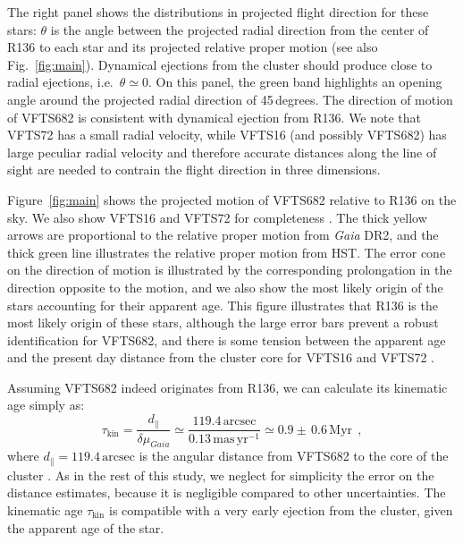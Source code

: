 \documentclass[apjl,twocolumn]{emulateapj}
\newcommand{\masyr}{\,\mathrm{mas}\,\mathrm{yr}^{-1}}
\DeclareRobustCommand{\Figref}[1]{Fig.~\ref{#1}}
\begin{document}
The right panel shows the distributions in projected flight direction for these
stars: $\theta$ is the angle between the projected radial direction from the
center of R136 to each star and its projected relative proper motion (see also \Figref{fig:main}). Dynamical ejections from the
cluster should %
produce
close to radial ejections, i.e.~$\theta\simeq0$. On this panel, the green band highlights
an opening angle around the
projected radial direction of 45\,degrees. The direction of motion of VFTS682 %
is consistent with dynamical ejection from R136. We note that
VFTS72 has a small radial velocity, while VFTS16 (and possibly VFTS682) has
large peculiar radial velocity and therefore accurate distances along
the line of sight are
needed to contrain the flight direction in three dimensions.

Figure~\ref{fig:main} shows the projected motion of VFTS682 relative to R136 on the
sky. We also show VFTS16 and VFTS72 for completeness
\citep[see][]{lennon:18}. The thick yellow arrows are proportional to
the relative proper motion from \emph{Gaia} DR2, and the thick green
line illustrates the relative proper motion from HST. The error cone
on the direction of motion is illustrated by the corresponding
prolongation in the direction opposite to the motion, and we also show
the most likely origin of the stars accounting for their apparent age.
This figure illustrates that R136 is the most likely origin of these stars, although the large error bars
prevent a robust identification for VFTS682, and there is some tension
between the apparent age and the present day distance from the cluster
core for VFTS16 and VFTS72 \citep[][]{lennon:18}. 

Assuming VFTS682 indeed originates from R136, we can calculate its kinematic
age simply as:
\begin{equation}
  \label{eq:kin_age}
  \tau_\mathrm{kin} = \frac{d_\parallel}{\delta\mu_{Gaia}} \simeq
  \frac{119.4\,\mathrm{arcsec}}{0.13\masyr} \simeq 0.9\pm\,0.6\, \mathrm{Myr} \ \ ,
\end{equation}
where $d_\parallel = 119.4\,\mathrm{arcsec}$ is the angular distance from VFTS682 to
the core of the cluster \citep[corresponding to $\sim$29\,pc at LMC distance,][]{bestenlehner:11}.
As in the rest of this study, we neglect for
simplicity the error on the distance estimates, because it is negligible compared to other uncertainties.
The kinematic age $\tau_\mathrm{kin}$ is compatible with a very early
ejection from the cluster, given the apparent age of the star.
\end{document}
